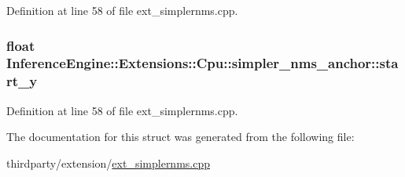 Definition at line 58 of file ext\+\_\+simplernms.\+cpp.

\subsubsection[{\texorpdfstring{start\+\_\+y}{start_y}}]{\setlength{\rightskip}{0pt plus 5cm}float Inference\+Engine\+::\+Extensions\+::\+Cpu\+::simpler\+\_\+nms\+\_\+anchor\+::start\+\_\+y}\hypertarget{structInferenceEngine_1_1Extensions_1_1Cpu_1_1simpler__nms__anchor_a8b8013577b401a0a51a629f95d9aaa6b}{}\label{structInferenceEngine_1_1Extensions_1_1Cpu_1_1simpler__nms__anchor_a8b8013577b401a0a51a629f95d9aaa6b}


Definition at line 58 of file ext\+\_\+simplernms.\+cpp.



The documentation for this struct was generated from the following file\+:\begin{DoxyCompactItemize}
\item 
thirdparty/extension/\hyperlink{ext__simplernms_8cpp}{ext\+\_\+simplernms.\+cpp}\end{DoxyCompactItemize}
